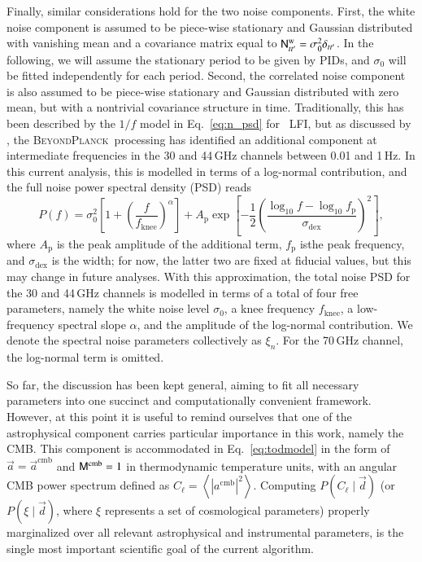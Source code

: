 \documentclass[onecolumn]{aa}
\renewcommand{\d}[0]{\vec{d}}
\renewcommand{\a}[0]{\vec{a}}
\newcommand{\N}[0]{\tens{N}}
\newcommand{\M}[0]{\tens{M}}
\newcommand{\BP}{\textsc{BeyondPlanck}}
\begin{document}
Finally, similar considerations hold for the two noise
components. First, the white noise component is assumed to be
piece-wise stationary and Gaussian distributed with vanishing mean and
a covariance matrix equal to $\N^{\mathrm{w}}_{tt'}=\sigma_0^2
\delta_{tt'}$. In the following, we will assume the stationary period
to be given by PIDs, and $\sigma_0$ will be fitted independently for
each period. Second, the correlated noise component is also assumed to
be piece-wise stationary and Gaussian distributed with zero mean, but
with a nontrivial covariance structure in time. Traditionally, this
has been described by the $1/f$ model in Eq.~\eqref{eq:n_psd} for
\Planck\ LFI, but as discussed by \citet{bp06}, the \BP\ processing
has identified an additional component at intermediate frequencies in
the 30 and 44\,GHz channels between 0.01 and 1\,Hz. In this current
analysis, this is modelled in terms of a log-normal contribution, and the full noise power spectral density (PSD) reads
\begin{equation}
        P(f) = \sigma_0^2\left[1 +
          \left(\frac{f}{f_\mathrm{knee}}\right)^\alpha\right] +
        A_\mathrm{p} \exp\left[-\frac{1}{2}\left(\frac{\log_{10}f -
            \log_{10}
            f_\mathrm{p}}{\sigma_\mathrm{dex}}\right)^2\right],
        \label{eq:1fmodel_lognorm}
\end{equation} 
where $A_\mathrm{p}$ is the peak amplitude of the additional term,
$f_\mathrm{p}$ isthe peak frequency, and $\sigma_\mathrm{dex}$ is the
width; for now, the latter two are fixed at fiducial values, but this
may change in future analyses.  With this approximation, the total
noise PSD for the 30 and 44\,GHz channels is modelled in terms of a
total of four free parameters, namely the white noise level
$\sigma_0$, a knee frequency $f_{\mathrm{knee}}$, a low-frequency
spectral slope $\alpha$, and the amplitude of the log-normal
contribution. We denote the spectral noise parameters collectively as
$\xi_n$. For the 70\,GHz channel, the log-normal term is omitted.

So far, the discussion has been kept general, aiming to fit all
necessary parameters into one succinct and computationally convenient
framework. However, at this point it is useful to remind ourselves
that one of the astrophysical component carries particular importance
in this work, namely the CMB. This component is accommodated in
Eq.~\eqref{eq:todmodel} in the form of $\a = \a^{\mathrm{cmb}}$ and
$\M^{\mathrm{cmb}} = 1$ in thermodynamic temperature units, with an
angular CMB power spectrum defined as $C_{\ell} = \left<
|a^{\mathrm{cmb}}|^2\right>$. Computing $P(C_{\ell}\mid \d)$ (or
$P(\xi\mid \d)$, where $\xi$ represents a set of cosmological parameters)
properly marginalized over all relevant astrophysical and instrumental
parameters, is the single most important scientific goal of the
current algorithm.
\end{document}
